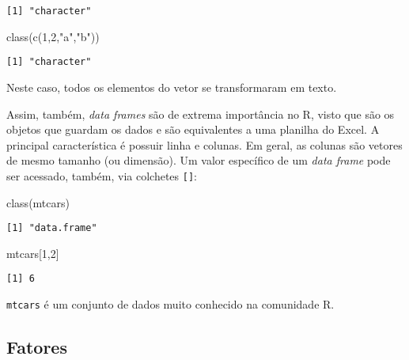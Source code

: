 \documentclass[
  12pt,
  letterpaper,
  DIV=11,
  numbers=noendperiod]{scrreprt}
\newenvironment{Shaded}{\begin{snugshade}}{\end{snugshade}}
\newcommand{\DecValTok}[1]{\textcolor[rgb]{0.68,0.00,0.00}{#1}}
\newcommand{\FunctionTok}[1]{\textcolor[rgb]{0.28,0.35,0.67}{#1}}
\newcommand{\NormalTok}[1]{\textcolor[rgb]{0.00,0.23,0.31}{#1}}
\newcommand{\StringTok}[1]{\textcolor[rgb]{0.13,0.47,0.30}{#1}}
\begin{document}
\begin{verbatim}
[1] "character"
\end{verbatim}

\begin{Shaded}
\begin{Highlighting}[]
\FunctionTok{class}\NormalTok{(}\FunctionTok{c}\NormalTok{(}\DecValTok{1}\NormalTok{,}\DecValTok{2}\NormalTok{,}\StringTok{"a"}\NormalTok{,}\StringTok{"b"}\NormalTok{))}
\end{Highlighting}
\end{Shaded}

\begin{verbatim}
[1] "character"
\end{verbatim}

\noindent Neste caso, todos os elementos do vetor se transformaram em
texto.

Assim, também, \emph{data frames} são de extrema importância no R, visto
que são os objetos que guardam os dados e são equivalentes a uma
planilha do Excel. A principal característica é possuir linha e colunas.
Em geral, as colunas são vetores de mesmo tamanho (ou dimensão). Um
valor específico de um \emph{data frame} pode ser acessado, também, via
colchetes \texttt{{[}{]}}:

\begin{Shaded}
\begin{Highlighting}[]
\FunctionTok{class}\NormalTok{(mtcars)}
\end{Highlighting}
\end{Shaded}

\begin{verbatim}
[1] "data.frame"
\end{verbatim}

\begin{Shaded}
\begin{Highlighting}[]
\NormalTok{mtcars[}\DecValTok{1}\NormalTok{,}\DecValTok{2}\NormalTok{]}
\end{Highlighting}
\end{Shaded}

\begin{verbatim}
[1] 6
\end{verbatim}

\noindent \texttt{mtcars} é um conjunto de dados muito conhecido na
comunidade R.

\subsection{Fatores}\label{fatores}
\end{document}
